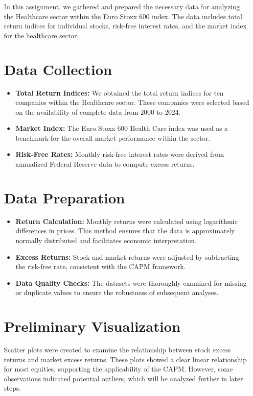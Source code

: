 In this assignment, we gathered and prepared the necessary data for analyzing the Healthcare sector within the Euro Stoxx 600
index. 
The data includes total return indices for individual stocks, risk-free interest rates, and the market index for the
healthcare sector.

\section{Data Collection}
\begin{itemize}
    \item \textbf{Total Return Indices:} We obtained the total return indices for ten companies within the Healthcare sector.
    These companies were selected based on the availability of complete data from 2000 to 2024.
    \item \textbf{Market Index:} The Euro Stoxx 600 Health Care index was used as a benchmark for the overall market performance
    within the sector.
    \item \textbf{Risk-Free Rates:} Monthly risk-free interest rates were derived from annualized Federal Reserve data to
    compute excess returns.
\end{itemize}

\section{Data Preparation}

\begin{itemize}
    \item \textbf{Return Calculation:} Monthly returns were calculated using logarithmic differences in prices. This method 
    ensures that the data is approximately normally distributed and facilitates economic interpretation.
    \item \textbf{Excess Returns:} Stock and market returns were adjusted by subtracting the risk-free rate, consistent with the 
    CAPM framework.
    \item \textbf{Data Quality Checks:} The datasets were thoroughly examined for missing or duplicate values to ensure the 
    robustness of subsequent analyses.

\end{itemize}

\section{Preliminary Visualization}
Scatter plots were created to examine the relationship between stock excess returns and market excess returns. 
These plots showed a clear linear relationship for most equities, supporting the applicability of the CAPM. 
However, some observations indicated potential outliers, which will be analyzed further in later steps.